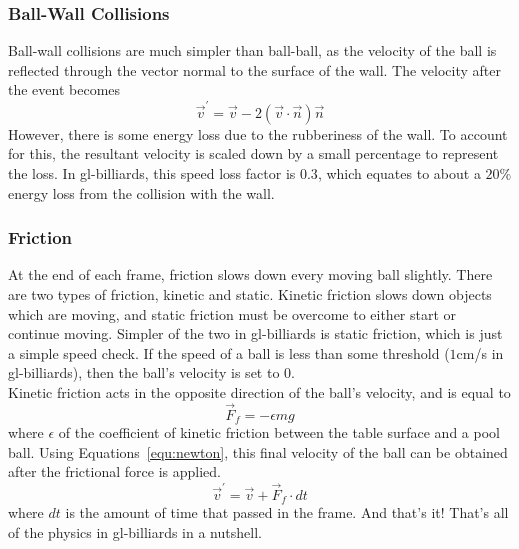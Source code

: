 \documentclass[12pt]{article}
\begin{document}
            \subsubsection{Ball-Wall Collisions}
            Ball-wall collisions are much simpler than ball-ball, as the velocity of the ball is reflected through the vector normal to the
            surface of the wall. The velocity after the event becomes
            \begin{equation}
                \vec v^\prime = \vec v - 2 (\vec v \cdot \vec n) \vec n
                \label{equ:after_ball_wall}
            \end{equation}
            However, there is some energy loss due to the rubberiness of the wall. To account for this, the resultant velocity is scaled down by
            a small percentage to represent the loss. In gl-billiards, this speed loss factor is $0.3$, which equates to about a $20\%$ energy
            loss from the collision with the wall.\\
            
            \subsubsection{Friction}
            At the end of each frame, friction slows down every moving ball slightly. There are two types of friction, kinetic and static.
            Kinetic friction slows down objects which are moving, and static friction must be overcome to either start or continue moving.
            Simpler of the two in gl-billiards is static friction, which is just a simple speed check. If the speed of a ball is less than
            some threshold ($1$cm/s in gl-billiards), then the ball's velocity is set to $0$. \\
            Kinetic friction acts in the opposite direction of the ball's velocity, and is equal to
            \begin{equation}
                \vec F_f = -\epsilon m g
                \label{equ:friction}
            \end{equation}
            where $\epsilon$ of the coefficient of kinetic friction between the table surface and a pool ball. Using Equations~\ref{equ:newton},
            this final velocity of the ball can be obtained after the frictional force is applied.
            \begin{equation}
                \vec v^\prime = \vec v + \vec F_f \cdot dt
                \label{equ:friction_velocity}
            \end{equation}
            where $dt$ is the amount of time that passed in the frame. And that's it! That's all of the physics in gl-billiards in a nutshell.
\end{document}
